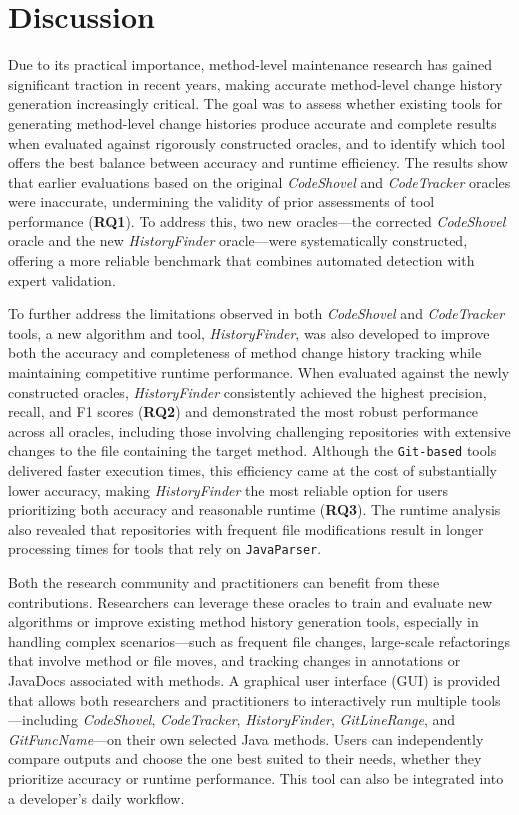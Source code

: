 \section{Discussion}
\label{sec:hf-discussion}
Due to its practical importance, method-level maintenance research has gained significant traction in recent years, making accurate method-level change history generation increasingly critical. The goal was to assess whether existing tools for generating method-level change histories produce accurate and complete results when evaluated against rigorously constructed oracles, and to identify which tool offers the best balance between accuracy and runtime efficiency. The results show that earlier evaluations based on the original \textit{CodeShovel} and \textit{CodeTracker} oracles were inaccurate, undermining the validity of prior assessments of tool performance (\textbf{RQ1}). To address this, two new oracles—the corrected \textit{CodeShovel} oracle and the new \textit{HistoryFinder} oracle—were systematically constructed, offering a more reliable benchmark that combines automated detection with expert validation.

To further address the limitations observed in both \textit{CodeShovel} and \textit{CodeTracker} tools, a new algorithm and tool, \textit{HistoryFinder}, was also developed to improve both the accuracy and completeness of method change history tracking while maintaining competitive runtime performance. When evaluated against the newly constructed oracles, \textit{HistoryFinder} consistently achieved the highest precision, recall, and F1 scores (\textbf{RQ2}) and demonstrated the most robust performance across all oracles, including those involving challenging repositories with extensive changes to the file containing the target method. Although the \texttt{Git-based} tools delivered faster execution times, this efficiency came at the cost of substantially lower accuracy, making \textit{HistoryFinder} the most reliable option for users prioritizing both accuracy and reasonable runtime (\textbf{RQ3}). The runtime analysis also revealed that repositories with frequent file modifications result in longer processing times for tools that rely on \texttt{JavaParser}.

Both the research community and practitioners can benefit from these contributions. Researchers can leverage these oracles to train and evaluate new algorithms or improve existing method history generation tools, especially in handling complex scenarios—such as frequent file changes, large-scale refactorings that involve method or file moves, and tracking changes in annotations or JavaDocs associated with methods.
A graphical user interface (GUI) is provided that allows both researchers and practitioners to interactively run multiple tools—including \textit{CodeShovel}, \textit{CodeTracker}, \textit{HistoryFinder}, \textit{GitLineRange}, and \textit{GitFuncName}—on their own selected Java methods. Users can independently compare outputs and choose the one best suited to their needs, whether they prioritize accuracy or runtime performance. This tool can also be integrated into a developer’s daily workflow.

